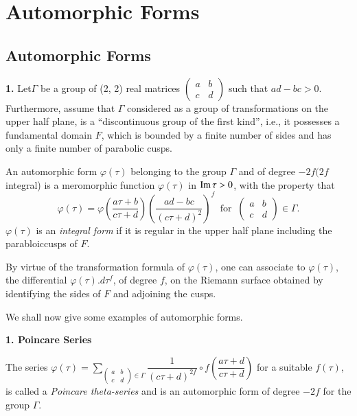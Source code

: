 \chapter{Automorphic Forms}\label{chap5}

\setcounter{section}{10}
\section{Automorphic Forms}\label{chap5:sec11}

\textbf{1.} Let\pageoriginale $\Gamma$ be a group of (2, 2) real
matrices $\begin{pmatrix} 
  a & b \\ c & d \end{pmatrix}$ such that $ad-bc> 0$. Furthermore,
assume that $\Gamma$ considered as a group of transformations on the
upper half plane, is a ``discontinuous group of the first kind'', i.e.,
it possesses a fundamental domain $F$, which is bounded by a finite
number of sides and has only a finite number of parabolic cusps. 

\begin{defi*}
  An automorphic form $\varphi (\tau)$ belonging to the group
  $\Gamma$ and of degree $-2f(2f$ integral) is a meromorphic function
  $\varphi (\tau)$ in $\operatorname{Im}  \tau > 0$, with the property that 
  $$
  \varphi(\tau) = \varphi \left(\frac{a \tau + b}{c \tau +
    d}\right)\left(\frac{ad - bc}{(c \tau + d)^2} \right)^f ~\text{ for
  }~ \begin{pmatrix} a & b \\ c & d \end{pmatrix} \in \Gamma. 
  $$
  $\varphi(\tau)$ is an \textit{integral form} if it is regular in the
  upper half plane including the parabloiccusps of $F$. 
\end{defi*}

By virtue of the transformation formula of $\varphi (\tau)$, one can
associate to $\varphi(\tau)$, the differential $\varphi(\tau).d
\tau^f$, of degree $f$, on the Riemann surface obtained by
identifying the sides of $F$ and adjoining the cusps. 

We shall now give some examples of automorphic forms.

\noindent 
\textbf{1. Poincare Series}%

The series $\varphi (\tau) = \sum\limits_{\begin{pmatrix} a & b \\ c
    & d \end{pmatrix}\in \Gamma} \dfrac{1}{(c \tau +d)^{2f }}\circ f
\left(\dfrac{a \tau + d}{c \tau + d}\right)$ for a suitable $f
(\tau)$, is called 
a \textit{ Poincare theta-series} and is an automorphic form of degree
$-2f$ for the group $\Gamma$. 

